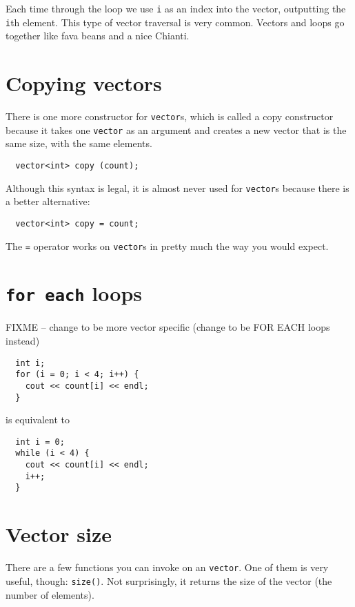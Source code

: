 
Each time through the loop we use {\tt i} as an index into
the vector, outputting the {\tt i}th element.  This type of
vector traversal is very common.  Vectors and loops go together
like fava beans and a nice Chianti.

\section{Copying vectors}

There is one more constructor for {\tt vector}s, which is
called a copy constructor because it takes one {\tt vector}
as an argument and creates a new vector that is the same size,
with the same elements.

\begin{verbatim}
  vector<int> copy (count);
\end{verbatim}
%
Although this syntax is legal, it is almost never used for
{\tt vector}s because there is a better alternative:

\begin{verbatim}
  vector<int> copy = count;
\end{verbatim}
%
The {\tt =} operator works on {\tt vector}s in pretty much
the way you would expect.


\section{{\tt for each} loops}
FIXME -- change to be more vector specific (change to be FOR EACH loops instead)




\begin{verbatim}
  int i;
  for (i = 0; i < 4; i++) {
    cout << count[i] << endl;
  }
\end{verbatim}
%
is equivalent to 

\begin{verbatim}
  int i = 0;
  while (i < 4) {
    cout << count[i] << endl;
    i++;
  }
\end{verbatim}

\section{Vector size}

There are a few functions you can invoke on an
{\tt vector}.  One of them is very useful, though: {\tt size()}.
Not surprisingly, it returns the size of the vector (the number
of elements).

